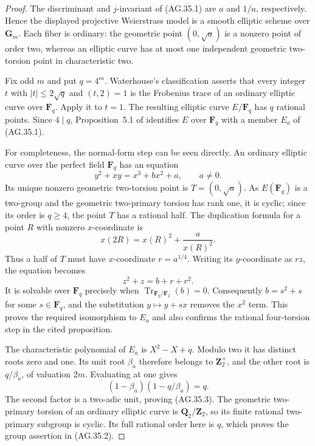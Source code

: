 \begin{proof}
The discriminant and $j$-invariant of (AG.35.1) are $a$ and $1/a$,
respectively. Hence the displayed projective Weierstrass model is
a smooth elliptic scheme over $\mathbf G_m$. Each fiber is ordinary:
the geometric point $(0,\sqrt a)$ is a nonzero point of order two,
whereas an elliptic curve has at most one independent geometric
two-torsion point in characteristic two.

Fix odd $m$ and put $q=4^m$. Waterhouse's classification
\citep[Theorem~4.1, case~(1), p.~536]{AG_Waterhouse1969}
asserts that every integer $t$ with $|t|\le2\sqrt q$ and
$(t,2)=1$ is the Frobenius trace of an ordinary elliptic curve
over $\mathbf F_q$. Apply it to $t=1$. The resulting elliptic
curve $E/\mathbf F_q$ has $q$ rational points.
Since $4\mid q$, Proposition~5.1 of
\citep[p.~311]{AG_AuerTop2002} identifies $E$ over $\mathbf F_q$
with a member $E_a$ of (AG.35.1).

For completeness, the normal-form step can be seen directly.
An ordinary elliptic curve over the perfect field $\mathbf F_q$
has an equation
\[
               y^2+xy=x^3+b x^2+a,\qquad a\ne0.
\]
Its unique nonzero geometric two-torsion point is
$T=(0,\sqrt a)$. As $E(\mathbf F_q)$ is a two-group and
the geometric two-primary torsion has rank one, it is cyclic;
since its order is $q\ge4$, the point $T$ has a rational half.
The duplication formula for a point $R$ with nonzero
$x$-coordinate is
\[
                 x(2R)=x(R)^2+\frac a{x(R)^2}.
\]
Thus a half of $T$ must have $x$-coordinate $r=a^{1/4}$.
Writing its $y$-coordinate as $rz$, the equation becomes
\[
                       z^2+z=b+r+r^2.
\]
It is solvable over $\mathbf F_q$ precisely when
$\operatorname{Tr}_{\mathbf F_q/\mathbf F_2}(b)=0$.
Consequently $b=s^2+s$ for some $s\in\mathbf F_q$, and
the substitution $y\mapsto y+sx$ removes the $x^2$ term.
This proves the required isomorphism to $E_a$ and also confirms
the rational four-torsion step in the cited proposition.

The characteristic polynomial of $E_a$ is $X^2-X+q$.
Modulo two it has distinct roots zero and one. Its unit root
$\beta_a$ therefore belongs to $\mathbf Z_2^\times$, and the
other root is $q/\beta_a$, of valuation $2m$. Evaluating at one
gives
\[
              (1-\beta_a)(1-q/\beta_a)=q.
\]
The second factor is a two-adic unit, proving (AG.35.3).
The geometric two-primary torsion of an ordinary elliptic curve
is $\mathbf Q_2/\mathbf Z_2$, so its finite rational two-primary
subgroup is cyclic. Its full rational order here is $q$, which
proves the group assertion in (AG.35.2).


\end{proof}
